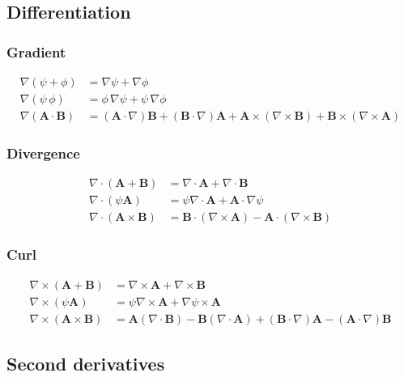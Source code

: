 \documentclass[11pt]{article}
\begin{document}
\begin{multicols}{2}
\subsection*{Differentiation}
\subsubsection*{Gradient}
\begin{align*}
 \nabla(\psi+\phi)&=\nabla\psi+\nabla\phi \\
 \nabla (\psi \, \phi) &= \phi \,\nabla \psi  + \psi \,\nabla \phi \\
 \nabla\left(\mathbf{A}\cdot\mathbf{B}\right)&=\left(\mathbf{A}\cdot\nabla\right)\mathbf{B}+\left(\mathbf{B}\cdot\nabla\right)\mathbf{A}+\mathbf{A}\times\left(\nabla\times\mathbf{B}\right)+\mathbf{B}\times\left(\nabla\times\mathbf{A}\right) 
\end{align*}

\subsubsection*{Divergence}
\begin{align*}
 \nabla\cdot(\mathbf{A}+\mathbf{B})&=\nabla\cdot\mathbf{A}+\nabla\cdot\mathbf{B} \\
 \nabla\cdot\left(\psi\mathbf{A}\right)&=\psi\nabla\cdot\mathbf{A}+\mathbf{A}\cdot\nabla \psi \\
 \nabla\cdot\left(\mathbf{A}\times\mathbf{B}\right)&=\mathbf{B}\cdot (\nabla\times\mathbf{A})-\mathbf{A}\cdot(\nabla\times\mathbf{B}) 
\end{align*}

\subsubsection*{Curl}
\begin{align*}
 \nabla\times(\mathbf{A}+\mathbf{B})&=\nabla\times\mathbf{A}+\nabla\times\mathbf{B} \\
 \nabla\times\left(\psi\mathbf{A}\right)&=\psi\nabla\times\mathbf{A}+\nabla\psi\times\mathbf{A}\\
 \nabla\times\left(\mathbf{A}\times\mathbf{B}\right)&=\mathbf{A}\left(\nabla\cdot\mathbf{B}\right)-\mathbf{B}\left(\nabla\cdot\mathbf{A}\right)+\left(\mathbf{B}\cdot\nabla\right)\mathbf{A}-\left(\mathbf{A}\cdot\nabla\right)\mathbf{B}
\end{align*}

\subsection*{Second derivatives}


\end{multicols}
\end{document}
